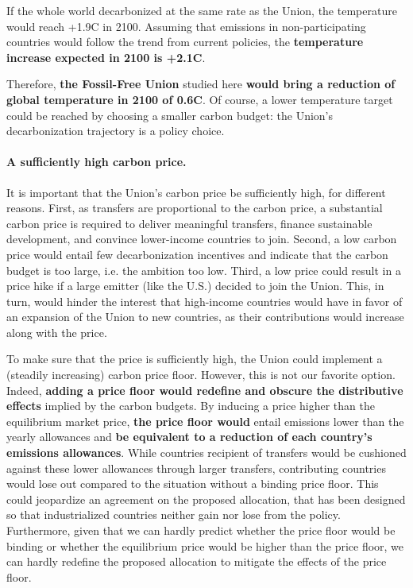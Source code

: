 \documentclass[12pt,english]{article}
\begin{document}
If the whole world decarbonized at the same rate as the Union, the temperature would reach +1.9\textdegree{}C in 2100. Assuming that emissions in non-participating countries would follow the trend from current policies, the \textbf{temperature increase expected in 2100 is +2.1\textdegree{}C}. %

Therefore, \textbf{the Fossil-Free Union} studied here \textbf{would bring a reduction of global temperature in 2100 of 0.6\textdegree{}C}. Of course, a lower temperature target could be reached by choosing a smaller carbon budget: the Union's decarbonization trajectory is a policy choice. %

\paragraph{A sufficiently high carbon price.}
It is important that the Union's carbon price be sufficiently high, for different reasons. First, as transfers are proportional to the carbon price, a substantial carbon price is required to deliver meaningful transfers, finance sustainable development, and convince lower-income countries to join. Second, a low carbon price would entail few decarbonization incentives and indicate that the carbon budget is too large, i.e. the ambition too low. Third, a low price could result in a price hike if a large emitter (like the U.S.) decided to join the Union. This, in turn, would hinder the interest that high-income countries would have in favor of an expansion of the Union to new countries, as their contributions would increase along with the price.

To make sure that the price is sufficiently high, the Union could implement a (steadily increasing) carbon price floor. However, this is not our favorite option. Indeed, \textbf{adding a price floor would redefine and obscure the distributive effects} implied by the carbon budgets. By inducing a price higher than the equilibrium market price, \textbf{the price floor would} entail emissions lower than the yearly allowances and \textbf{be equivalent to a reduction of each country's emissions allowances}. While countries recipient of transfers would be cushioned against these lower allowances through larger transfers, contributing countries would lose out compared to the situation without a binding price floor. This could jeopardize an agreement on the proposed allocation, that has been designed so that industrialized countries neither gain nor lose from the policy. Furthermore, given that we can hardly predict whether the price floor would be binding or whether the equilibrium price would be higher than the price floor, we can hardly redefine the proposed allocation to mitigate the effects of the price floor.
\end{document}
